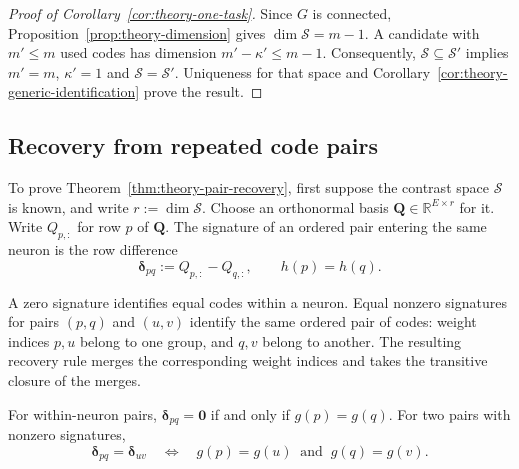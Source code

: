 \begin{proof}[Proof of Corollary~\ref{cor:theory-one-task}]
    Since $G$ is connected,
    Proposition~\ref{prop:theory-dimension} gives
    $\dim\mathcal S=m-1$.
    A candidate with $m'\le m$ used codes has dimension
    $m'-\kappa'\le m-1$.
    Consequently,
    $\mathcal S\subseteq\mathcal S'$
    implies $m'=m$, $\kappa'=1$ and
    $\mathcal S=\mathcal S'$.
    Uniqueness for that space and
    Corollary~\ref{cor:theory-generic-identification} prove the result.
\end{proof}

\subsection{Recovery from repeated code pairs}
\label{app:theory-pairs}

To prove Theorem~\ref{thm:theory-pair-recovery}, first suppose the
contrast space $\mathcal S$ is known, and write
$r:=\dim\mathcal S$.
Choose an orthonormal basis
$\mathbf Q\in\mathbb R^{E\times r}$ for it.
Write $Q_{p,:}$ for row $p$ of $\mathbf Q$. The signature of
an ordered pair entering the same neuron is the row difference
\begin{equation}
    \boldsymbol\delta_{pq}:=Q_{p,:}-Q_{q,:},\qquad h(p)=h(q).
    \label{eq:theory-signature}
\end{equation}

A zero signature identifies equal codes within a neuron.
Equal nonzero signatures for pairs $(p,q)$ and $(u,v)$ identify the
same ordered pair of codes: weight indices $p,u$ belong to one group,
and $q,v$ belong to another.
The resulting recovery rule merges the corresponding weight indices
and takes the transitive closure of the merges.

\begin{lemma}
    \label{lem:theory-signatures}
    For within-neuron pairs, $\boldsymbol\delta_{pq}=\mathbf0$
    if and only if $g(p)=g(q)$. For two pairs with nonzero
    signatures,
    \begin{equation}
        \boldsymbol\delta_{pq}=\boldsymbol\delta_{uv}
        \quad\Longleftrightarrow\quad
        g(p)=g(u)\ \text{ and }\ g(q)=g(v).
        \label{eq:appendix-theory-signature-information}
    \end{equation}

\end{lemma}

